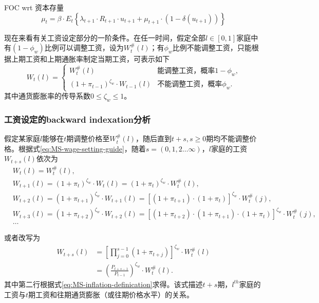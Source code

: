 FOC wrt 资本存量
\begin{equation}
\label{eq:MS-HH-FOC-K-real}
\mu_t = \beta \cdot E_t \left\{
  \lambda_{t+1} \cdot R_{t+1} \cdot u_{t+1} + \mu_{t+1} \cdot \left(1-\delta(u_{t+1})\right)
\right\}
\end{equation}

现在来看有关工资设定部分的一阶条件。在任一时间，假定全部$l \in [0,1]$家庭中有$(1- \phi_w)$比例可以调整工资，设为$W_t^{\#}(l)$；有$\phi_w$比例不能调整工资，只能根据上期工资和上期通胀率制定当期工资，可表示如下
\begin{equation}
\label{eq:MS-wage-setting-guide}
W_t(l) =
\begin{cases}
W_t^{\#}(l) & \mbox{能调整工资，概率$1-\phi_w$,} \\
\left(1+\pi_{t-1}\right)^{\zeta_w} \cdot W_{t-1}(l) &\mbox{不能调整工资，概率$\phi_w$.}
\end{cases}
\end{equation}
其中通货膨胀率的传导系数$0 \le \zeta_w \le 1$。

\subsubsection{工资设定的backward indexation分析}
假定某家庭$l$能够在$t$期调整价格至$W_t^{\#}(l)$，随后直到$t+s, s\ge 0$期均不能调整价格。根据式\eqref{eq:MS-wage-setting-guide}，随着$s=(0,1,2 \ldots \infty )$，$l$家庭的工资$W_{t+s}(l)$依次为
\begin{align*}
&W_t(l) = W_t^{\#}(l), \\
&W_{t+1}(l) = (1+\pi_t)^{\zeta_w} \cdot W_{t}(l) =  (1+\pi_t)^{\zeta_w} \cdot W_{t}^{\#}(l), \\
&W_{t+2}(l) = (1+\pi_{t+1})^{\zeta_w} \cdot W_{t+1}(l)
= \left[
\left(1+\pi_{t+1}\right) \cdot \left(1 + \pi_t \right)
\right]^{\zeta_w} \cdot W_{t}^{\#}(j),\\
&W_{t+3}(l) = (1+\pi_{t+2})^{\zeta_w} \cdot W_{t+2}(l)
= \left[
\left(1+\pi_{t+2}\right) \cdot \left(1+\pi_{t+1}\right) \cdot \left(1 + \pi_t \right)
\right]^{\zeta_w} \cdot W_{t}^{\#}(j),\\
& \ldots
\end{align*}

或者改写为
\begin{equation}
\label{eq:MS-updating-wage-recursion}
\begin{split}
W_{t+s}(l) &= \left[\prod_{j=0}^{s-1} \left(1+\pi_{t+j}\right)\right]^{\zeta_w} \cdot W_t^{\#}(l) \\
&=\left(\frac{P_{t+s-1}}{P_{t-1}}\right)^{\zeta_w} \cdot W_t^{\#}(l).
\end{split}
\end{equation}
其中第二行根据式\eqref{eq:MS-inflation-definication}求得。该式描述$t+s$期，$l^{th}$家庭的工资与$t$期工资和往期通货膨胀（或往期价格水平）的关系。

